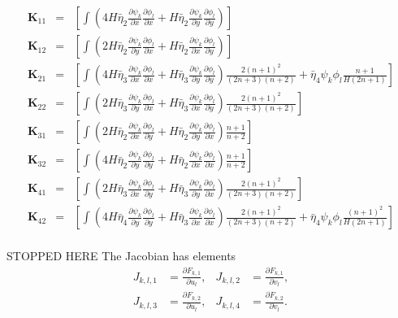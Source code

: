 \documentclass{amsart}
\newcommand{\diff}[2]{\ensuremath{\frac{\partial #1}{\partial #2}}}
\begin{document}
\begin{equation*}
  \begin{array}{rcl}
    \mathbf{K}_{11} & = &\left[\int \left( 4 H \bar\eta_2 \diff{\psi_k}{x}\diff{\phi_l}{x} + H \bar\eta_2 \diff{\psi_k}{y}\diff{\phi_l}{y}\right) \right] \\
    \mathbf{K}_{12} & = &\left[\int \left( 2 H \bar\eta_2 \diff{\psi_k}{y}\diff{\phi_l}{x} + H \bar\eta_2 \diff{\psi_k}{x}\diff{\phi_l}{y}\right) \right] \\
    \mathbf{K}_{21} & = &\left[\int \left( 4 H \bar\eta_3 \diff{\psi_k}{x}\diff{\phi_l}{x} + H \bar\eta_3 \diff{\psi_k}{y}\diff{\phi_l}{y}\right) \frac{2(n+1)^2}{(2n+3)(n+2)} + \bar \eta_4 \psi_k \phi_l \frac{n+1}{H(2n+1)} \right] \\
    \mathbf{K}_{22} & = &\left[\int \left( 2 H \bar\eta_3 \diff{\psi_k}{y}\diff{\phi_l}{x} + H \bar\eta_3 \diff{\psi_k}{x}\diff{\phi_l}{y}\right) \frac{2(n+1)^2}{(2n+3)(n+2)} \right] \\
    \mathbf{K}_{31} & = &\left[\int \left( 2 H \bar\eta_2 \diff{\psi_k}{x}\diff{\phi_l}{y} + H \bar\eta_2 \diff{\psi_k}{y}\diff{\phi_l}{x}\right) \frac{n+1}{n+2} \right] \\
    \mathbf{K}_{32} & = &\left[\int \left( 4 H \bar\eta_2 \diff{\psi_k}{y}\diff{\phi_l}{y} + H \bar\eta_2 \diff{\psi_k}{x}\diff{\phi_l}{x}\right) \frac{n+1}{n+2} \right] \\
    \mathbf{K}_{41} & = &\left[\int \left( 2 H \bar\eta_3 \diff{\psi_k}{x}\diff{\phi_l}{y} + H \bar\eta_3 \diff{\psi_k}{y}\diff{\phi_l}{x}\right) \frac{2(n+1)^2}{(2n+3)(n+2)}  \right] \\
    \mathbf{K}_{42} & = &\left[\int \left( 4 H \bar\eta_4 \diff{\psi_k}{y}\diff{\phi_l}{y} + H \bar\eta_3 \diff{\psi_k}{x}\diff{\phi_l}{x}\right) \frac{2(n+1)^2}{(2n+3)(n+2)} + \bar \eta_4 \psi_k \phi_l \frac{(n+1)^2}{H(2n+1)} \right] \\
  \end{array}
\end{equation*}



STOPPED HERE
The Jacobian has elements
\begin{align*}
  J_{k,l,1} & = \diff{F_{k,1}}{u_l}, & J_{k,l,2} & = \diff{F_{k,1}}{v_l},\\
  J_{k,l,3} & = \diff{F_{k,2}}{u_l}, & J_{k,l,4} & = \diff{F_{k,2}}{v_l}.\\
\end{align*}
\end{document}
